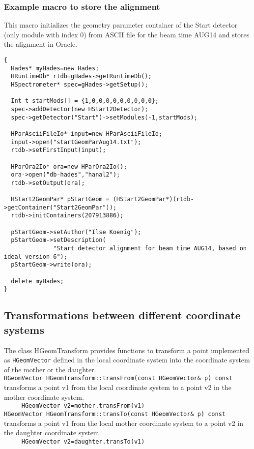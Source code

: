 \subsubsection*{Example macro to store the alignment}
This macro initializes the geometry parameter container of the Start detector (only module with index 0) from ASCII file for 
the beam time AUG14 and stores the alignment in Oracle. 
\begin{lstlisting}
{
  Hades* myHades=new Hades;
  HRuntimeDb* rtdb=gHades->getRuntimeDb();
  HSpectrometer* spec=gHades->getSetup();

  Int_t startMods[] = {1,0,0,0,0,0,0,0,0,0};
  spec->addDetector(new HStart2Detector);
  spec->getDetector("Start")->setModules(-1,startMods);

  HParAsciiFileIo* input=new HParAsciiFileIo;
  input->open("startGeomParAug14.txt");
  rtdb->setFirstInput(input);

  HParOra2Io* ora=new HParOra2Io();
  ora->open("db-hades","hanal2");
  rtdb->setOutput(ora);

  HStart2GeomPar* pStartGeom = (HStart2GeomPar*)(rtdb->getContainer("Start2GeomPar"));
  rtdb->initContainers(207913886);

  pStartGeom->setAuthor("Ilse Koenig");
  pStartGeom->setDescription(
              "Start detector alignment for beam time AUG14, based on ideal version 6");
  pStartGeom->write(ora);

  delete myHades;
}
\end{lstlisting}


\subsection[Transformations between different coordinate systems]{Transformations between different coordinate systems}

The class HGeomTransform provides functions to transform a point implemented as \verb+HGeomVector+ defined in the local 
coordinate system into the coordinate system of the mother or the daughter.\\

\verb+HGeomVector HGeomTransform::transFrom(const HGeomVector& p) const+\\
transforms a point v1 from the local coordinate system to a point v2 in the mother coordinate system.\\
\verb+     HGeomVector v2=mother.transFrom(v1)+\\

\verb+HGeomVector HGeomTransform::transTo(const HGeomVector& p) const+\\
transforms a point v1 from the local mother coordinate system to a point v2 in the daughter coordinate system.\\
\verb+     HGeomVector v2=daughter.transTo(v1)+\\

